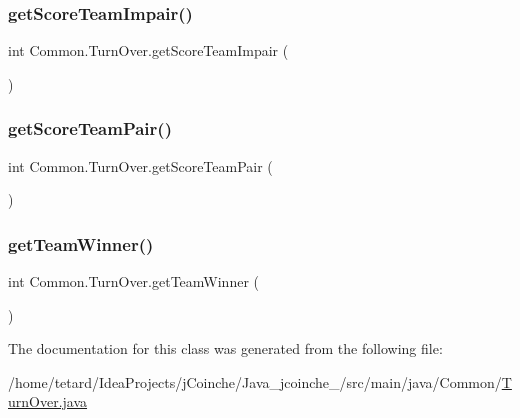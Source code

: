 \subsubsection{\texorpdfstring{get\+Score\+Team\+Impair()}{getScoreTeamImpair()}}
{\footnotesize\ttfamily int Common.\+Turn\+Over.\+get\+Score\+Team\+Impair (\begin{DoxyParamCaption}{ }\end{DoxyParamCaption})\hspace{0.3cm}{\ttfamily [inline]}}

\mbox{\label{classCommon_1_1TurnOver_aaebd9886a748957fb4e5180acf6916de}} 
\subsubsection{\texorpdfstring{get\+Score\+Team\+Pair()}{getScoreTeamPair()}}
{\footnotesize\ttfamily int Common.\+Turn\+Over.\+get\+Score\+Team\+Pair (\begin{DoxyParamCaption}{ }\end{DoxyParamCaption})\hspace{0.3cm}{\ttfamily [inline]}}

\mbox{\label{classCommon_1_1TurnOver_a0c289567ad579b5d0c7dab7369eb669f}} 
\subsubsection{\texorpdfstring{get\+Team\+Winner()}{getTeamWinner()}}
{\footnotesize\ttfamily int Common.\+Turn\+Over.\+get\+Team\+Winner (\begin{DoxyParamCaption}{ }\end{DoxyParamCaption})\hspace{0.3cm}{\ttfamily [inline]}}



The documentation for this class was generated from the following file\+:\begin{DoxyCompactItemize}
\item 
/home/tetard/\+Idea\+Projects/j\+Coinche/\+Java\+\_\+jcoinche\+\_/src/main/java/\+Common/\mbox{\hyperlink{TurnOver_8java}{Turn\+Over.\+java}}\end{DoxyCompactItemize}
